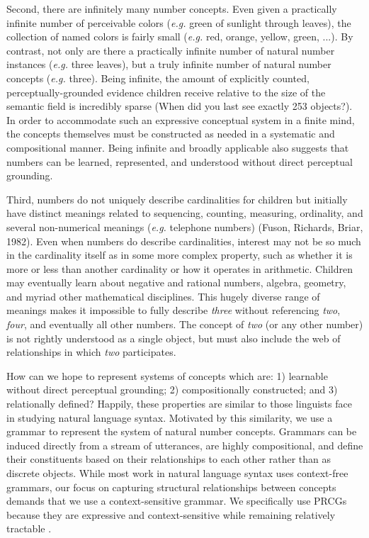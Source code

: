 \documentclass[10pt,letterpaper]{article}
\begin{document}
Second, there are infinitely many number concepts. Even given a
practically infinite number of perceivable colors ({\it e.g.} green of
sunlight through leaves), the collection of named colors is fairly
small ({\it e.g.} red, orange, yellow, green, ...). By contrast, not
only are there a practically infinite number of natural number
instances ({\it e.g.} three leaves), but a truly infinite number of
natural number concepts ({\it e.g.} three). Being infinite, the amount
of explicitly counted, perceptually-grounded evidence children receive
relative to the size of the semantic field is incredibly sparse (When
did you last see exactly 253 objects?). In order to accommodate such
an expressive conceptual system in a finite mind, the concepts
themselves must be constructed as needed in a systematic and
compositional manner. Being infinite and broadly applicable also
suggests that numbers can be learned, represented, and understood
without direct perceptual grounding.

Third, numbers do not uniquely describe cardinalities for children but
initially have distinct meanings related to sequencing, counting,
measuring, ordinality, and several non-numerical meanings ({\it e.g.}
telephone numbers) (Fuson, Richards, Briar, 1982). Even when numbers
do describe cardinalities, interest may not be so much in the
cardinality itself as in some more complex property, such as whether
it is more or less than another cardinality or how it operates
in arithmetic. Children may eventually learn about negative
and rational numbers, algebra, geometry, and myriad other mathematical
disciplines. This hugely diverse range of meanings makes it impossible
to fully describe \emph{three} without referencing \emph{two},
\emph{four}, and eventually all other numbers. The concept of
\emph{two} (or any other number) is not rightly understood as a single
object, but must also include the web of relationships in which
\emph{two} participates.

How can we hope to represent systems of concepts which are: 1)
learnable without direct perceptual grounding; 2) compositionally
constructed; and 3) relationally defined? Happily, these properties
are similar to those linguists face in studying natural language
syntax. Motivated by this similarity, we use a grammar to represent
the system of natural number concepts. Grammars can be induced
directly from a stream of utterances, are highly compositional, and
define their constituents based on their relationships to each other
rather than as discrete objects. While most work in natural language
syntax uses context-free grammars, our focus on capturing structural
relationships between concepts demands that we use a context-sensitive
grammar. We specifically use PRCGs because they are expressive and
context-sensitive while remaining relatively tractable
\citep{boullier2005range}.
\end{document}
